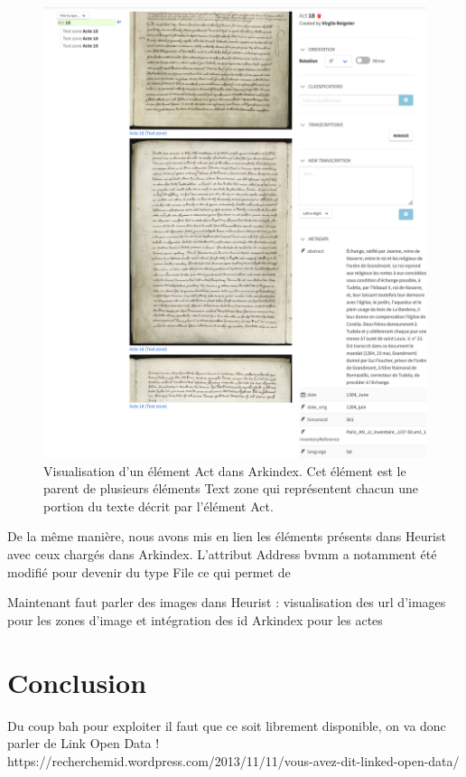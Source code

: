 \documentclass[a4paper,12pt,twoside]{book}
\begin{document}
	\begin{figure}
		\centering
		\includegraphics[width=12cm]{Images/Act_on_Arkindex.png}
		\caption{Visualisation d'un élément \og Act\fg{} dans Arkindex. Cet élément est le parent de plusieurs éléments \og Text zone\fg{} qui représentent chacun une portion du texte décrit par l'élément \og Act\fg{}.}
		\label{Act_on_Arkindex}
	\end{figure}

	De la même manière, nous avons mis en lien les éléments présents dans Heurist avec ceux chargés dans Arkindex. L'attribut \og Address bvmm\fg{} a notamment été modifié pour devenir du type \og File\fg{} ce qui permet de 
	
	Maintenant faut parler des images dans Heurist : visualisation des url d'images pour les zones d'image et intégration des id Arkindex pour les actes
	
	\section*{Conclusion}
	
	
	Du coup bah pour exploiter il faut que ce soit librement disponible, on va donc parler de Link Open Data !
	https://recherchemid.wordpress.com/2013/11/11/vous-avez-dit-linked-open-data/
	
\end{document}
